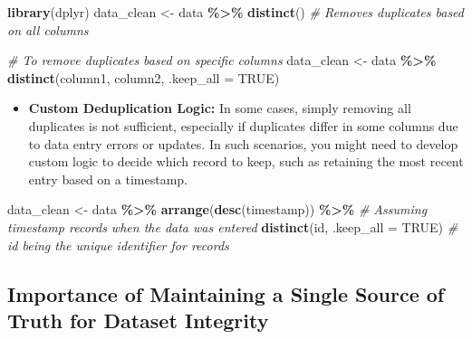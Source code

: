 \documentclass[
]{book}
\newenvironment{Shaded}{\begin{snugshade}}{\end{snugshade}}
\newcommand{\AttributeTok}[1]{\textcolor[rgb]{0.13,0.29,0.53}{#1}}
\newcommand{\CommentTok}[1]{\textcolor[rgb]{0.56,0.35,0.01}{\textit{#1}}}
\newcommand{\ConstantTok}[1]{\textcolor[rgb]{0.56,0.35,0.01}{#1}}
\newcommand{\FunctionTok}[1]{\textcolor[rgb]{0.13,0.29,0.53}{\textbf{#1}}}
\newcommand{\NormalTok}[1]{#1}
\newcommand{\OtherTok}[1]{\textcolor[rgb]{0.56,0.35,0.01}{#1}}
\newcommand{\SpecialCharTok}[1]{\textcolor[rgb]{0.81,0.36,0.00}{\textbf{#1}}}
\providecommand{\tightlist}{%
  \setlength{\itemsep}{0pt}\setlength{\parskip}{0pt}}
\begin{document}
\begin{Shaded}
\begin{Highlighting}[]
\FunctionTok{library}\NormalTok{(dplyr)}
\NormalTok{data\_clean }\OtherTok{\textless{}{-}}\NormalTok{ data }\SpecialCharTok{\%\textgreater{}\%}
  \FunctionTok{distinct}\NormalTok{() }\CommentTok{\# Removes duplicates based on all columns}

\CommentTok{\# To remove duplicates based on specific columns}
\NormalTok{data\_clean }\OtherTok{\textless{}{-}}\NormalTok{ data }\SpecialCharTok{\%\textgreater{}\%}
  \FunctionTok{distinct}\NormalTok{(column1, column2, }\AttributeTok{.keep\_all =} \ConstantTok{TRUE}\NormalTok{)}
\end{Highlighting}
\end{Shaded}

\begin{itemize}
\tightlist
\item
  \textbf{Custom Deduplication Logic:} In some cases, simply removing all duplicates is not sufficient, especially if duplicates differ in some columns due to data entry errors or updates. In such scenarios, you might need to develop custom logic to decide which record to keep, such as retaining the most recent entry based on a timestamp.
\end{itemize}

\begin{Shaded}
\begin{Highlighting}[]
\NormalTok{data\_clean }\OtherTok{\textless{}{-}}\NormalTok{ data }\SpecialCharTok{\%\textgreater{}\%}
  \FunctionTok{arrange}\NormalTok{(}\FunctionTok{desc}\NormalTok{(timestamp)) }\SpecialCharTok{\%\textgreater{}\%} \CommentTok{\# Assuming \textquotesingle{}timestamp\textquotesingle{} records when the data was entered}
  \FunctionTok{distinct}\NormalTok{(id, }\AttributeTok{.keep\_all =} \ConstantTok{TRUE}\NormalTok{) }\CommentTok{\# \textquotesingle{}id\textquotesingle{} being the unique identifier for records}
\end{Highlighting}
\end{Shaded}

\hypertarget{importance-of-maintaining-a-single-source-of-truth-for-dataset-integrity}{%
\subsection*{Importance of Maintaining a Single Source of Truth for Dataset Integrity}\label{importance-of-maintaining-a-single-source-of-truth-for-dataset-integrity}}
\end{document}
